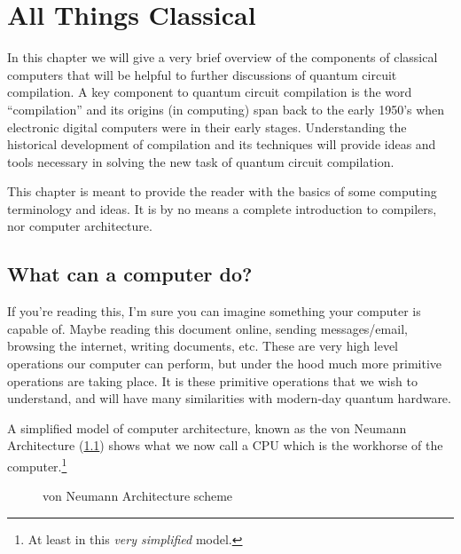 \chapter{All Things Classical}\label{chap:compilers}

In this chapter we will give a very brief overview of the components of classical computers that will be helpful to further discussions of quantum circuit compilation.
A key component to quantum circuit compilation is the word ``compilation'' and its origins (in computing) span back to the early 1950's when electronic digital computers were in their early stages.
Understanding the historical development of compilation and its techniques will provide ideas and tools necessary in solving the new task of quantum circuit compilation.

This chapter is meant to provide the reader with the basics of some computing terminology and ideas.
It is by no means a complete introduction to compilers, nor computer architecture.

\section{What can a computer do?}

If you're reading this, I'm sure you can imagine something your computer is capable of.
Maybe reading this document online, sending messages/email, browsing the internet, writing documents, etc.
These are very high level operations our computer can perform, but under the hood much more primitive operations are taking place.
It is these primitive operations that we wish to understand, and will have many similarities with modern-day quantum hardware.

A simplified model of computer architecture, known as the von Neumann Architecture (\cref{fig:comparch}) shows what we now call a \ac{CPU} which is the workhorse of the computer.\footnote{At least in this \emph{very simplified} model.}

\begin{figure}[h]
    \centering
    
    \caption{von Neumann Architecture scheme}\label{fig:comparch}
\end{figure}

